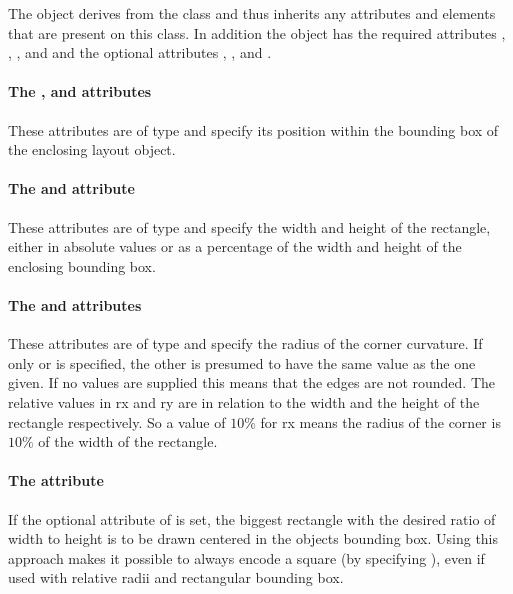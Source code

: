 The \RenderRectangle object derives from the \GraphicalPrimitiveTwoD
class and thus inherits any attributes and elements that are present on
this class.
In addition the \RenderRectangle object has the required attributes , 
, , and  and the optional attributes 
, ,  and .

\paragraph{The \fixttspace{}, \fixttspace{} and \fixttspace{}  attributes}

These attributes are of type
\RelAbsVector and specify its position within the 
bounding box of the enclosing layout object.

\paragraph{The \fixttspace{} and \fixttspace{} attribute}

These attributes are of type
\RelAbsVector and specify the width and height of the rectangle, 
either in absolute values or as a percentage of the width and height of the 
enclosing bounding box. 

\paragraph{The \fixttspace{} and \fixttspace{} attributes}

These attributes are of type
\RelAbsVector and specify the radius of the corner curvature. If only 
or  is specified, the other is presumed to have the same value as the 
one given. If no values are supplied this means that the edges are not rounded.
The relative values in rx and ry are in relation to the width and the height of
 the rectangle respectively. So a value of $10\%$ for rx means the radius of 
the corner is $10\%$ of the width of the rectangle. 


\paragraph{The \fixttspace{} attribute}
If the optional  attribute of  is set, the biggest 
rectangle with the desired ratio of width to height is to be drawn centered in the 
objects bounding box. Using this approach makes it possible to always encode a 
square (by specifying ), even if used with relative radii and 
rectangular bounding box. 


